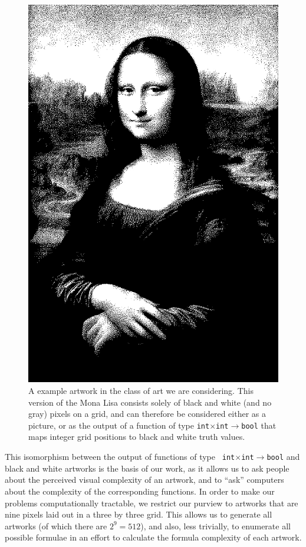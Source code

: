 \documentclass[11pt]{article}
\begin{document}
\begin{figure}
\begin{center}
\includegraphics[width=5in]{monalisa_mono.jpg}
\end{center}
\caption{A example artwork in the class of art we are considering.  This
version of the Mona Lisa consists solely of black and white (and no gray)
pixels on a grid, and can therefore be considered either as a picture, or as
the output of a function of type {\tt int$\times$int$\to$bool} that maps
integer grid positions to black and white truth values.}
\label{fig:monalisa}
\end{figure}

This isomorphism between the output of functions of type {\tt
int$\times$int$\to$bool} and black and white artworks is the basis of our work,
as it allows us to ask people about the perceived visual complexity of an
artwork, and to ``ask'' computers about the complexity of the corresponding
functions.  In order to make our problems computationally tractable, we
restrict our purview to artworks that are nine pixels laid out in a three by
three grid.  This allows us to generate all artworks (of which there are
$2^9=512$), and also, less trivially, to enumerate all possible formulae in an
effort to calculate the formula complexity of each artwork.
\end{document}
